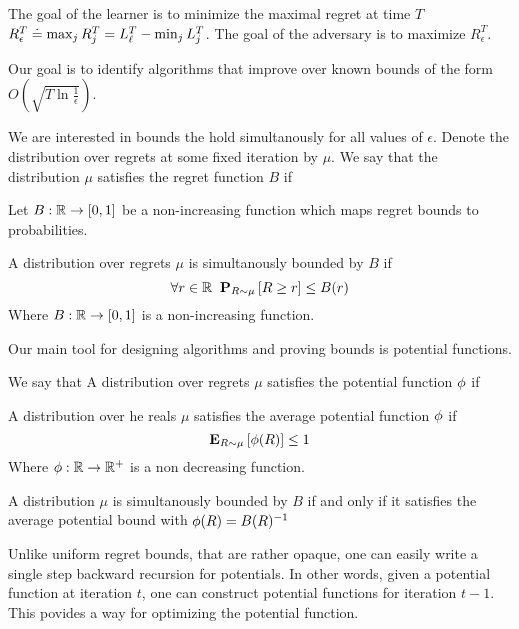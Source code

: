 \documentclass[12pt]{article} %
\begin{document}
The goal of the learner is to minimize the maximal regret at time $T$
$R_{\epsilon}^T \doteq \max_j R_j^T = L_\ell^T - \min_j L_j^T$.
The goal of the adversary is to maximize $R_{\epsilon}^T$.

Our goal is to identify algorithms that improve over known bounds of the
form $O(\sqrt{T \ln \frac{1}{\epsilon}})$.

We are interested in bounds the hold simultanously for all values
of $\epsilon$. Denote the distribution over regrets at some fixed
iteration by $\mu$. We say that the distribution $\mu$ satisfies the regret function $B$ if

\begin{definition} \label{def:unif-regret-bound}
  Let $B: \mathbb{R} \to [0,1]$ be a non-increasing function which maps
  regret bounds to probabilities.
  
  A distribution over regrets $\mu$ is simultanously bounded by $B$ if
  \[
    \forall r \in \mathbb{R} \;\; {\bf P}_{R \sim \mu}\left[ R \geq r \right] \leq B(r)
  \]
Where $B: \mathbb{R} \to [0,1]$ is a non-increasing function.
\end{definition}

Our main tool for designing algorithms and proving bounds is potential
functions.

We say that  A distribution over regrets $\mu$ satisfies
the potential function $\phi$ if 

\begin{definition} \label{def:aver-potential-bound}
  A distribution over he reals $\mu$ satisfies the average
  potential function $\phi$ if
  $${\bf E}_{R \sim \mu}\left[ \phi(R) \right] \leq 1$$
  Where $\phi: \mathbb{R} \to \mathbb{R}^+$ is a non decreasing function. 
\end{definition}

\begin{theorem}
 A distribution $\mu$ is simultanously bounded by $B$ if and only
 if it satisfies the average potential bound with $\phi(R) = B(R)^{-1}$
\end{theorem}

Unlike uniform regret bounds, that are rather opaque, one can easily
write a single step backward recursion for potentials. In other words,
given a potential function at iteration $t$, one can construct
potential functions for iteration $t-1$. This povides a way 
for optimizing the potential function.
\end{document}
